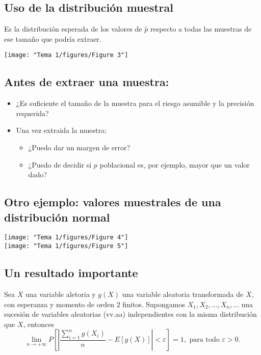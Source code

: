 \subsection{Uso de la distribución muestral}
\begin{tcolorbox}[colback=blue!5!white, colframe=blue!75!black, title=\textbf{La distribución muestral de $\hat{p}$:}]
Es la distribución esperada de los valores de $\hat{p}$ respecto a todas las muestras de ese tamaño que podría extraer.
\end{tcolorbox}
\begin{center}
  \texttt{[image: "Tema 1/figures/Figure 3"]}
\end{center}
\subsection{Antes de extraer una muestra:}
\begin{itemize}[label=\textbullet]
  \item ¿Es suficiente el tamaño de la muestra para el riesgo asumible y la precisión requerida?
  \item Una vez extraida la muestra:
    \begin{itemize}[label=\textrightarrow]
      \item ¿Puedo dar un margen de error?
      \item ¿Puedo de decidir si $p$ poblacional es, por ejemplo, mayor que un valor dado?
    \end{itemize}
\end{itemize}
\subsection{Otro ejemplo: valores muestrales de una distribución normal}
\begin{center}
  \texttt{[image: "Tema 1/figures/Figure 4"]}\\
  \texttt{[image: "Tema 1/figures/Figure 5"]}\\
\end{center}
\subsection{Un resultado importante}
\begin{tcolorbox}[colback=blue!5!white, colframe=blue!75!black, title=\textbf{Ley (débil) de los grandes números}]
Sea $X$ una variable aletoria y $g(X)$ una variable aleatoria transformada de  $X$, con esperanza y momento de orden 2 finitos. Supongamos $X_1,X_2,\dots,X_n,\dots$ una sucesión de variables aleatorias (vv.aa) independientes con la misma distribución que $X$, entonces  \[
  \lim_{n \to +\infty} P\left[ \left| \dfrac{\sum_{i=1}^{n} g(X_i)}{n}-E[g(X)] \right| < \varepsilon \right] =1,\text{ para todo }\varepsilon>0.
\] 
\end{tcolorbox}
